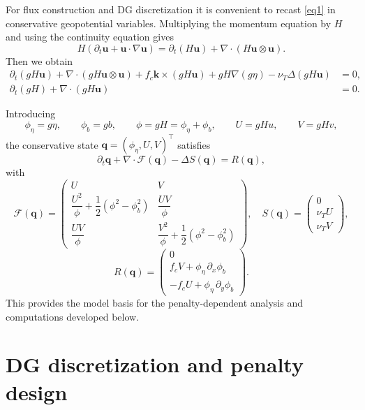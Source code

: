 \documentclass[pdflatex,sn-mathphys-num]{sn-jnl}%
\theoremstyle{thmstyleone}%
\theoremstyle{thmstyletwo}%
\theoremstyle{thmstylethree}%
\begin{document}
For flux construction and DG discretization it is convenient to recast \eqref{eq1} in conservative geopotential variables. 
Multiplying the momentum equation by $H$ and using the continuity equation gives
\[
H(\partial_t\mathbf{u}+\mathbf{u}\cdot\nabla\mathbf{u})
=\partial_t(H\mathbf{u})+\nabla\cdot(H\mathbf{u}\otimes\mathbf{u}).
\]
Then we obtain
\begin{equation}
\label{eq2}
\begin{aligned}
\partial_t(gH\mathbf{u})+\nabla\cdot(gH\mathbf{u}\otimes\mathbf{u})
+f_c\mathbf{k}\times(gH\mathbf{u})+gH\nabla(g\eta)
-\nu_T\Delta(gH\mathbf{u})&=0,\\
\partial_t(gH)+\nabla\cdot(gH\mathbf{u})&=0.
\end{aligned}
\end{equation}

Introducing
\[
\phi_\eta=g\eta,\qquad \phi_b=gb,\qquad \phi=gH=\phi_\eta+\phi_b,
\qquad U=gHu,\qquad V=gHv,
\]
the conservative state $\mathbf q=(\phi_\eta,U,V)^\top$ satisfies
\begin{equation}
\label{eq3}
\partial_t\mathbf q+\nabla\cdot\mathcal F(\mathbf q)-\Delta S(\mathbf q)=R(\mathbf q),
\end{equation}
with
\[
\mathcal F(\mathbf q)=
\begin{pmatrix}
U & V\\[0.2em]
\dfrac{U^2}{\phi}+\dfrac12(\phi^2-\phi_b^2) & \dfrac{UV}{\phi}\\[0.8em]
\dfrac{UV}{\phi} & \dfrac{V^2}{\phi}+\dfrac12(\phi^2-\phi_b^2)
\end{pmatrix},
\quad
S(\mathbf q)=
\begin{pmatrix}0\\ \nu_TU\\ \nu_TV\end{pmatrix},
\]
\[
R(\mathbf q)=
\begin{pmatrix}
0\\[0.2em]
f_cV+\phi_\eta\,\partial_x\phi_b\\[0.2em]
-f_cU+\phi_\eta\,\partial_y\phi_b
\end{pmatrix}.
\]
This provides the model basis for the penalty-dependent analysis and computations developed below. 

\section{DG discretization and penalty design}
\label{sec:space}
\end{document}
